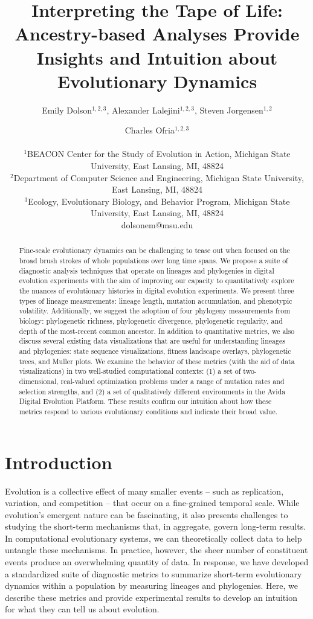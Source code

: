 \documentclass[letterpaper]{article}
\title{Interpreting the Tape of Life: Ancestry-based Analyses Provide Insights and Intuition about Evolutionary Dynamics}
\author{Emily Dolson$^{1,2,3}$, Alexander Lalejini$^{1,2, 3}$, Steven Jorgensen$^{1,2}$ \and Charles Ofria$^{1,2, 3}$ \\
\mbox{}\\
$^1$BEACON Center for the Study of Evolution in Action, Michigan State University, East Lansing, MI, 48824 \\
$^2$Department of Computer Science and Engineering, Michigan State University, East Lansing, MI, 48824 \\
$^3$Ecology, Evolutionary Biology, and Behavior Program, Michigan State University, East Lansing, MI, 48824 \\
dolsonem@msu.edu} %
\begin{document}
\maketitle

\begin{abstract}
Fine-scale evolutionary dynamics can be challenging to tease out when focused on the broad brush strokes of whole populations over long time spans. We propose a suite of diagnostic analysis techniques that operate on lineages and phylogenies in digital evolution experiments with the aim of improving our capacity to quantitatively explore the nuances of evolutionary histories in digital evolution experiments. We present three types of lineage measurements: lineage length, mutation accumulation, and phenotypic volatility. Additionally, we suggest the adoption of four phylogeny measurements from biology: phylogenetic richness, phylogenetic divergence, phylogenetic regularity, and depth of the most-recent common ancestor. 
In addition to quantitative metrics, we also discuss several existing data visualizations that are useful for understanding lineages and phylogenies: state sequence visualizations, fitness landscape overlays, phylogenetic trees, and Muller plots.
We examine the behavior of these metrics (with the aid of data visualizations) in two well-studied computational contexts: (1) a set of two-dimensional, real-valued optimization problems under a range of mutation rates and selection strengths, and (2) a set of qualitatively different environments in the Avida Digital Evolution Platform.  These results confirm our intuition about how these metrics respond to various evolutionary conditions and indicate their broad value.
\end{abstract}

\section{Introduction}

Evolution is a collective effect of many smaller events -- such as replication, variation, and competition -- that occur on a fine-grained temporal scale. While evolution's emergent nature can be fascinating, it also presents challenges to studying the short-term mechanisms that, in aggregate, govern long-term results. In computational evolutionary systems, we can theoretically collect data to help untangle these mechanisms. In practice, however, the sheer number of constituent events produce an overwhelming quantity of data.
In response, we have developed a standardized suite of diagnostic metrics to summarize short-term evolutionary dynamics within a population by measuring lineages and phylogenies. Here, we describe these metrics and provide experimental results to develop an intuition for what they can tell us about evolution.
\end{document}
